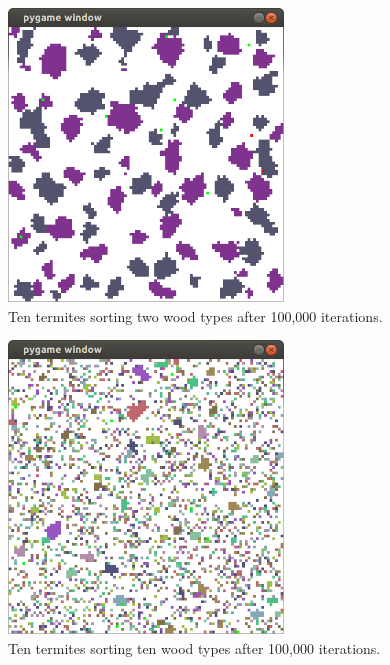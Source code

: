 \documentclass{article}
\begin{document}
\begin{enumerate}
\begin{figure}[H]
\centering
\includegraphics[width=0.65\textwidth]{figs/part_7_2.png}
\caption{Ten termites sorting two wood types after 100,000 iterations.}
\end{figure}

\begin{figure}[H]
\centering
\includegraphics[width=0.65\textwidth]{figs/part_7_3.png}
\caption{Ten termites sorting ten wood types after 100,000 iterations.}
\end{figure}


\end{enumerate}
\end{document}
